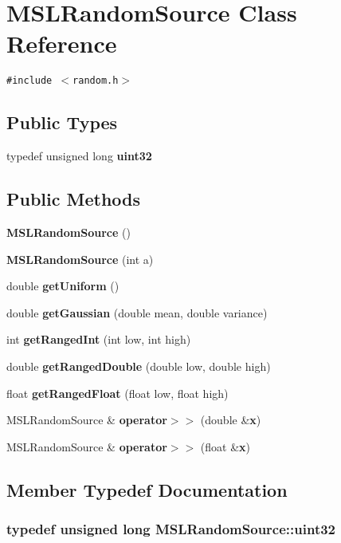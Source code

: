 \section{MSLRandom\-Source  Class Reference}
\label{classMSLRandomSource}
{\tt \#include $<$random.h$>$}

\subsection*{Public Types}
\begin{CompactItemize}
\item 
typedef unsigned long {\bf uint32}
\end{CompactItemize}
\subsection*{Public Methods}
\begin{CompactItemize}
\item 
{\bf MSLRandom\-Source} ()
\item 
{\bf MSLRandom\-Source} (int a)
\item 
double {\bf get\-Uniform} ()
\item 
double {\bf get\-Gaussian} (double mean, double variance)
\item 
int {\bf get\-Ranged\-Int} (int low, int high)
\item 
double {\bf get\-Ranged\-Double} (double low, double high)
\item 
float {\bf get\-Ranged\-Float} (float low, float high)
\item 
MSLRandom\-Source \& {\bf operator$>$$>$} (double \&{\bf x})
\item 
MSLRandom\-Source \& {\bf operator$>$$>$} (float \&{\bf x})
\end{CompactItemize}


\subsection{Member Typedef Documentation}
\subsubsection{\setlength{\rightskip}{0pt plus 5cm}typedef unsigned long MSLRandom\-Source::uint32}\label{classMSLRandomSource_s0}




